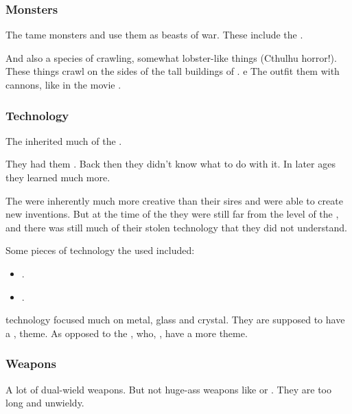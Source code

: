 \subsubsection{Monsters}
The \resphain{} tame monsters and use them as beasts of war. 
These include the . 

And also a species of crawling, somewhat lobster-like things (Cthulhu horror!). 
These things crawl on the sides of the tall buildings of \Nyx. e
The \resphain{} outfit them with cannons, like in the movie \cite{Movie:D-War}. 





\subsubsection{Technology}
The \resphain{} inherited much of the . 

They had them . 
Back then they didn't know what to do with it. 
In later ages they learned much more. 

The \resphain{} were inherently much more creative than their \bane{} sires and were able to create new inventions. 
But at the time of the \thirdbanewar they were still far from the level of the \voyagers, and there was still much of their stolen \voyager{} technology that they did not understand. 

Some pieces of technology the \resphain used included:
\begin{itemize}
  \item {}.
  \item {}.
\end{itemize}

\Resphan technology focused much on metal, glass and crystal.
They are supposed to have a ,  theme.
As opposed to the \dragons, who, , have a more  theme. 






\subsubsection{Weapons}
A lot of \resphain{} dual-wield weapons. 
But not huge-ass weapons like \senain{} or \belthradeth. 
They are too long and unwieldy. 

